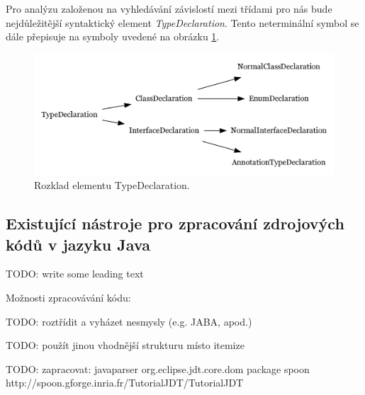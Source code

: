 Pro analýzu založenou na vyhledávání závislostí mezi třídami pro nás bude nejdůležitější syntaktický element \emph{TypeDeclaration}. Tento neterminální symbol se dále přepisuje na symboly uvedené na obrázku \ref{type_declaration_options}.

\begin{figure}[h!]
  \centering
  \includegraphics[width=\textwidth]{./graphs/toplevel_types.png}
  \caption{Rozklad elementu TypeDeclaration.\label{type_declaration_options}}
\end{figure}







\subsection{Existující nástroje pro zpracování zdrojových kódů v jazyku Java}

TODO: write some leading text

Možnosti zpracovávání kódu:

TODO: roztřídit a vyházet nesmysly (e.g. JABA, apod.)

TODO: použít jinou vhodnější strukturu místo itemize

TODO: zapracovat:
javaparser
org.eclipse.jdt.core.dom package
spoon http://spoon.gforge.inria.fr/TutorialJDT/TutorialJDT


